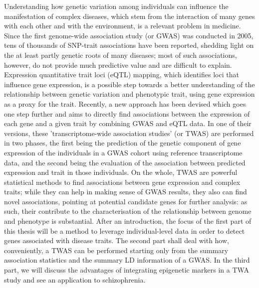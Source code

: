 \documentclass[a4paper,oneside,marginals=justified,nobib]{tufte-book}
\begin{document}
Understanding how genetic variation among individuals can influence the 
manifestation of complex diseases, which stem from the interaction of 
many genes with each other and with the environment, is a relevant 
problem in medicine. Since the first genome-wide association study (or 
GWAS) was conducted in 2005, tens of thousands  of SNP-trait 
associations have been reported, shedding light on the at least partly 
genetic roots of many diseases; most of such associations, however, do 
not provide much predictive value and are difficult to explain. 
Expression quantitative trait loci (eQTL) mapping, which identifies loci 
that influence gene expression, is a possible step towards a better 
understanding of the relationship between genetic variation and 
phenotypic trait, using gene expression as a proxy for the trait. 
Recently, a new approach has been devised which goes one step further 
and aims to directly find associations between the expression of each 
gene and a given trait by combining GWAS and eQTL data. In one of their 
versions, these 'transcriptome-wide association studies' (or TWAS) are 
performed in two phases, the first being the prediction of the genetic 
component of gene expression of the individuals in a GWAS cohort using 
reference transcriptome data, and the second being the evaluation of the 
association between predicted expression and trait in those individuals. 
On the whole, TWAS are powerful statistical methods to find associations 
between gene expression and complex traits; while they can help in 
making sense of GWAS results, they also can find novel associations, 
pointing at potential candidate genes for further analysis: as such, 
their contribute to the characterisation of the relationship between 
genome and phenotype is substantial. After an introduction, the focus of 
the first part of this thesis will be a method to leverage 
individual-level data in order to detect genes associated with disease 
traits. The second part shall deal with how, conveniently, a TWAS can be 
performed starting only from the summary association statistics and the 
summary LD information of a GWAS. In the third part, we will discuss the 
advantages of integrating epigenetic markers in a TWA study and see an 
application to schizophrenia.



\mainmatter


\end{document}
